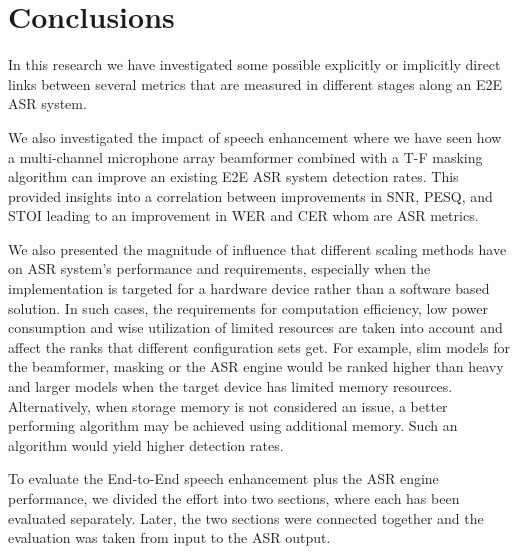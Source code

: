\chapter{Conclusions}\label{ch:concl_ch}
\vspace{-1cm}
In this research we have 
investigated some possible 
explicitly or implicitly direct links
between
several metrics that are measured 
in different stages along an E2E ASR system.

\bigskip

We also investigated the 
impact of speech enhancement 
where we have seen how
a multi-channel microphone array beamformer
combined with a T-F masking algorithm
can improve an existing E2E ASR system detection rates.
This provided insights into a correlation 
between improvements in SNR, PESQ, and STOI
leading 
to an improvement in WER and CER whom
are ASR metrics.

\bigskip

We also presented
the magnitude of influence
that different scaling methods have 
on ASR system's performance and requirements,
especially when the implementation is targeted for
a hardware device rather than a software based solution.
In such cases, the requirements for
computation efficiency, low power consumption
and wise utilization of limited resources
are taken into account and affect the 
ranks that different configuration sets
get. For example, slim models for the
beamformer, masking or the ASR engine 
would be ranked higher than heavy and 
larger models
when the target device has limited memory resources.
Alternatively, when storage memory is not considered an issue, 
a better performing algorithm may 
be achieved using additional memory. 
Such an algorithm would yield higher detection rates.
\bigskip

To evaluate the End-to-End speech enhancement
plus the ASR engine performance, we divided
the effort into two sections, where each has been
evaluated separately. Later, the two sections 
were connected together and the evaluation was
taken from input to the ASR output.

\bigskip

